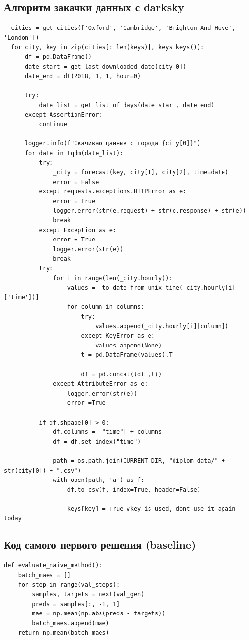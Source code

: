 \documentclass[11pt]{article}
\begin{document}
\subsection{Алгоритм закачки данных с darksky}
\label{sec:org0be4789}
\begin{verbatim}
  cities = get_cities(['Oxford', 'Cambridge', 'Brighton And Hove', 'London'])
  for city, key in zip(cities[: len(keys)], keys.keys()): 
      df = pd.DataFrame()
      date_start = get_last_downloaded_date(city[0])
      date_end = dt(2018, 1, 1, hour=0)
    
      try:
          date_list = get_list_of_days(date_start, date_end)
      except AssertionError:
          continue

      logger.info(f"Скачиваю данные с города {city[0]}")
      for date in tqdm(date_list):
          try:
              _city = forecast(key, city[1], city[2], time=date)
              error = False
          except requests.exceptions.HTTPError as e:
              error = True
              logger.error(str(e.request) + str(e.response) + str(e))
              break
          except Exception as e:
              error = True
              logger.error(str(e))
              break
          try:
              for i in range(len(_city.hourly)):
                  values = [to_date_from_unix_time(_city.hourly[i]['time'])]
                  for column in columns:
                      try:
                          values.append(_city.hourly[i][column])
                      except KeyError as e:
                          values.append(None)
                      t = pd.DataFrame(values).T
                    
                      df = pd.concat((df ,t))
              except AttributeError as e:
                  logger.error(str(e))
                  error =True

          if df.shpape[0] > 0:
              df.columns = ["time"] + columns
              df = df.set_index("time")

              path = os.path.join(CURRENT_DIR, "diplom_data/" + str(city[0]) + ".csv")
              with open(path, 'a') as f:
                  df.to_csv(f, index=True, header=False)
                
                  keys[key] = True #key is used, dont use it again today
\end{verbatim}
\subsection{Код самого первого решения (baseline)}
\label{sec:org0c8cfbe}
\begin{verbatim}
def evaluate_naive_method():
    batch_maes = []
    for step in range(val_steps):
        samples, targets = next(val_gen)
        preds = samples[:, -1, 1]
        mae = np.mean(np.abs(preds - targets))
        batch_maes.append(mae)
    return np.mean(batch_maes)
\end{verbatim}
\end{document}
